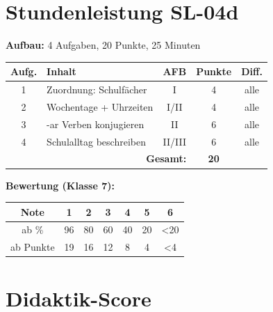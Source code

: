 \documentclass[11pt,a4paper]{article}
\begin{document}
\section{Stundenleistung SL-04d}

\textbf{Aufbau:} 4 Aufgaben, 20 Punkte, 25 Minuten

\begin{tabular}{|c|l|c|c|c|}
\hline
\textbf{Aufg.} & \textbf{Inhalt} & \textbf{AFB} & \textbf{Punkte} & \textbf{Diff.} \\
\hline
1 & Zuordnung: Schulfächer & I & 4 & alle \\
\hline
2 & Wochentage + Uhrzeiten & I/II & 4 & alle \\
\hline
3 & -ar Verben konjugieren & II & 6 & alle \\
\hline
4 & Schulalltag beschreiben & II/III & 6 & alle \\
\hline
\multicolumn{3}{|r|}{\textbf{Gesamt:}} & \textbf{20} & \\
\hline
\end{tabular}

\textbf{Bewertung (Klasse 7):}
\begin{tabular}{|c|c|c|c|c|c|c|}
\hline
Note & 1 & 2 & 3 & 4 & 5 & 6 \\
\hline
ab \% & 96 & 80 & 60 & 40 & 20 & <20 \\
\hline
ab Punkte & 19 & 16 & 12 & 8 & 4 & <4 \\
\hline
\end{tabular}

\newpage
\section{Didaktik-Score}
\end{document}
